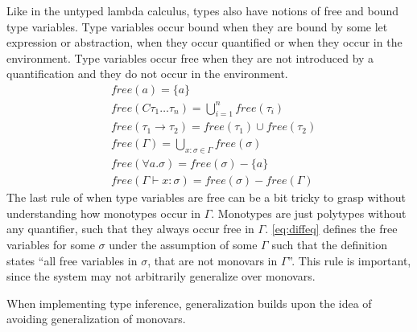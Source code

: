 \documentclass[11pt,oneside,a4paper]{report}
\begin{document}
Like in the untyped lambda calculus, types also have notions of free and bound type variables.
Type variables occur bound when they are bound by some let expression or abstraction, when they occur quantified or when they occur in the environment.
Type variables occur free when they are not introduced by a quantification and they do not occur in the environment.
\begin{align}
	 & \textit{free}(a) = \{ a \}                                                              \tag*{}\\
	 & \textit{free}(C \tau_1 \dots \tau_n ) = \bigcup_{i = 1}^n \textit{free}(\tau_i)           \tag*{}\\
     & \textit{free}(\tau_1 \rightarrow \tau_2) = \textit{free}(\tau_1) \cup \textit{free}(\tau_2)  \tag*{}        \\
	 & \textit{free}(\Gamma) = \bigcup_{x:\sigma \in \Gamma} \textit{free}(\sigma)             \tag*{}\\
   & \textit{free}(\forall a . \sigma) = \textit{free}(\sigma) - \{ a \}                     \tag*{}\\
   & \textit{free}(\Gamma \vdash x : \sigma) = \textit{free}(\sigma) - \textit{free}(\Gamma) \label{eq:diffeq}
\end{align}
The last rule of when type variables are free can be a bit tricky to grasp without understanding how monotypes occur in $\Gamma$.
Monotypes are just polytypes without any quantifier, such that they always occur free in $\Gamma$.
\autoref{eq:diffeq} defines the free variables for some $\sigma$ under the assumption of some $\Gamma$ such that the definition states ``all free variables in $\sigma$, that are not monovars in $\Gamma$''.
This rule is important, since the system may not arbitrarily generalize over monovars.
\begin{remark}
  When implementing type inference, generalization builds upon the idea of avoiding generalization of monovars.
\end{remark}
\end{document}
